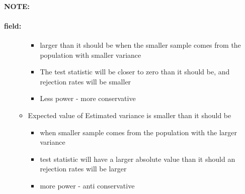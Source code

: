 \documentclass[12pt]{article}
\newenvironment{note}{\paragraph{NOTE:}}{}
\newenvironment{field}{\paragraph{field:}}{}
\begin{document}
\begin{note}
\begin{field}
\begin{itemize}
\begin{itemize}
            \begin{itemize}
              \item larger than it should be when the smaller sample comes from the population with smaller variance
              \item The test statistic will be closer to zero than it should be, and rejection rates will be smaller
              \item Less power - more conservative
            \end{itemize}
          \item Expected value of Estimated variance is smaller than it should be
          \begin{itemize}
            \item when smaller sample comes from the population with the larger variance
            \item test statistic will have a larger absolute value than it should an rejection rates will be larger
            \item more power - anti conservative
          \end{itemize}
         \end{itemize}
  \end{itemize}
 \end{field}
\end{note}
\end{document}
